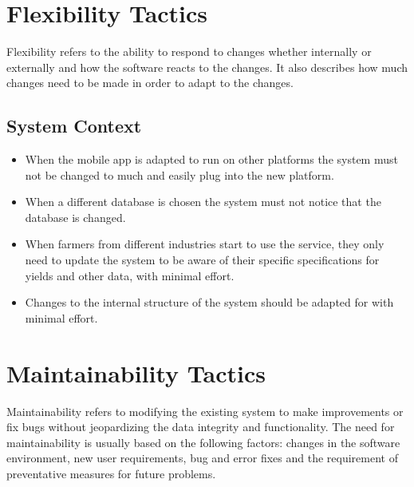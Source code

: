 \documentclass[11pt,fleqn]{book} %
\begin{document}
	\section{Flexibility Tactics}
	Flexibility refers to the ability to respond to changes whether internally or externally and how the software reacts to the changes. It also describes how much changes need to be made in order to adapt to the changes.
	\subsection{System Context}
	\begin{itemize}
		\item When the mobile app is adapted to run on other platforms the system must not be changed to much and easily plug into the new platform.
		\item When a different database is chosen the system must not notice that the database is changed.
		\item When farmers from different industries start to use the service, they only need to update the system to be aware of their specific specifications for yields and other data, with minimal effort.
		\item Changes to the internal structure of the system should be adapted for with minimal effort.
	\end{itemize}
	\section{Maintainability Tactics}
	Maintainability refers to modifying the existing system to make improvements or fix bugs without jeopardizing the data integrity and functionality. The need for maintainability is usually based on the following factors: changes in the software environment, new user requirements, bug and error fixes and the requirement of preventative measures for future problems.
\end{document}
